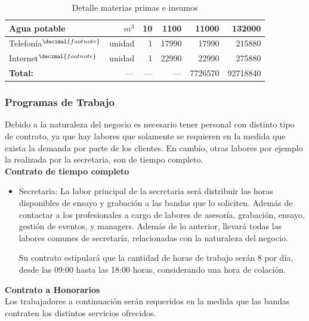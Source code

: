 \begin{table}[h]
\begin{tabular}{|l|r|r|r|r|r|}
	Agua potable                                                & $m^3$                           & 10                 & 1100    & 11000   &   132000 \\\hline
	Telefonía$^{\decimal{footnote}}$ \addtocounter{footnote}{1} & unidad                          & 1                  & 17990   & 17990   &   215880 \\\hline
	Internet$^{\decimal{footnote}}$                             & unidad                          & 1                  & 22990   & 22990   &   275880 \\\hline
	\textbf{Total:}												& ---							  & --- 			   & ---     & 7726570 & 92718840 \\\hline
	\end{tabular}
\caption{Detalle materias primas e insumos}
\label{tab:insumos}
\end{table}

\subsubsection{Programas de Trabajo}

Debido a la naturaleza del negocio es necesario
tener personal con distinto tipo de contrato, ya
que hay labores que solamente se requieren en
la medida que exista la demanda por parte
de los clientes. En cambio, otras labores por
ejemplo la realizada por la secretaria, son de
tiempo completo.\\

\textbf{Contrato de tiempo completo}

\begin{itemize}
 \item Secretaria: La labor principal de la secretaria
	será distribuir las horas disponibles de ensayo
	y grabación a las bandas que lo soliciten. Además
	de contactar a los profesionales a cargo de labores
	de asesoría, grabación, ensayo, gestión de eventos, 
	y managers. Además de lo anterior, llevará todas las
	labores comunes de secretaría, relacionadas con la
	naturaleza del negocio.
	
	Su contrato estipulará que la cantidad
	de horas de trabajo serán 8 por día, desde las 09:00
	hasta las 18:00 horas, considerando una hora de colación.
\end{itemize}

\textbf{Contrato a Honorarios}\\

Los trabajadores a continuación serán requeridos en la medida que 
las bandas contraten los distintos servicios ofrecidos.

